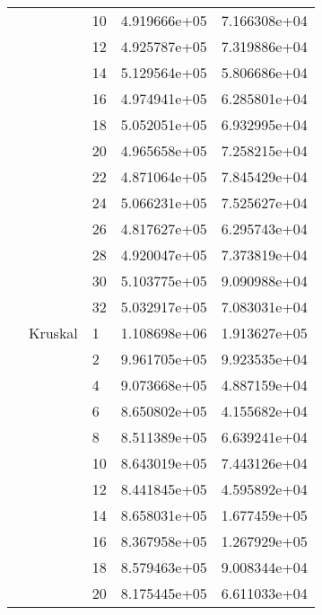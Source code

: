 \begin{tabular}{lllrr}
                      &            & 10 &  4.919666e+05 &  7.166308e+04 \\
                      &            & 12 &  4.925787e+05 &  7.319886e+04 \\
                      &            & 14 &  5.129564e+05 &  5.806686e+04 \\
                      &            & 16 &  4.974941e+05 &  6.285801e+04 \\
                      &            & 18 &  5.052051e+05 &  6.932995e+04 \\
                      &            & 20 &  4.965658e+05 &  7.258215e+04 \\
                      &            & 22 &  4.871064e+05 &  7.845429e+04 \\
                      &            & 24 &  5.066231e+05 &  7.525627e+04 \\
                      &            & 26 &  4.817627e+05 &  6.295743e+04 \\
                      &            & 28 &  4.920047e+05 &  7.373819e+04 \\
                      &            & 30 &  5.103775e+05 &  9.090988e+04 \\
                      &            & 32 &  5.032917e+05 &  7.083031e+04 \\
                      & Kruskal & 1  &  1.108698e+06 &  1.913627e+05 \\
                      &            & 2  &  9.961705e+05 &  9.923535e+04 \\
                      &            & 4  &  9.073668e+05 &  4.887159e+04 \\
                      &            & 6  &  8.650802e+05 &  4.155682e+04 \\
                      &            & 8  &  8.511389e+05 &  6.639241e+04 \\
                      &            & 10 &  8.643019e+05 &  7.443126e+04 \\
                      &            & 12 &  8.441845e+05 &  4.595892e+04 \\
                      &            & 14 &  8.658031e+05 &  1.677459e+05 \\
                      &            & 16 &  8.367958e+05 &  1.267929e+05 \\
                      &            & 18 &  8.579463e+05 &  9.008344e+04 \\
                      &            & 20 &  8.175445e+05 &  6.611033e+04 \\

\end{tabular}
